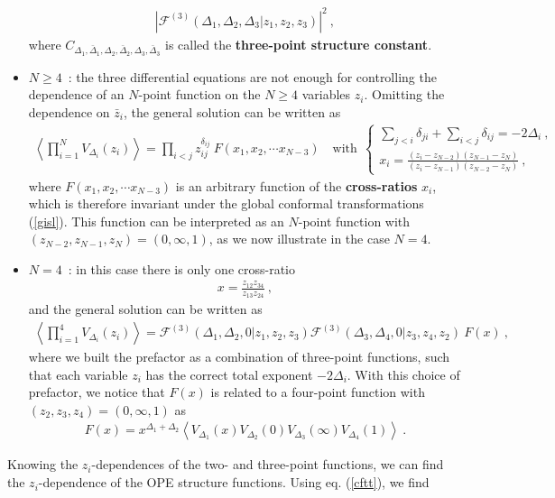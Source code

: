 \documentclass[12pt,a4paper,notitlepage]{report}
\newcommand \la {\left\langle}
\newcommand \ra {\right\rangle}
\newcommand \bla {\left\{\begin{array}{l} }
\newcommand \ela {\end{array}\right. }
\numberwithin{equation}{section}
\theoremstyle{break}
\begin{document}
\begin{itemize}
\begin{align}
 \left|\mathcal{F}^{(3)}(\Delta_1,\Delta_2,\Delta_3|z_1,z_2,z_3)\right|^2\ ,
\label{cff}
\end{align}
where $C_{\Delta_1,\bar{\Delta}_1,\Delta_2,\bar{\Delta}_2,\Delta_3,\bar{\Delta}_3}$ is called the \textbf{\boldmath three-point structure constant}.
\item $\boxed{N\geq 4}$\ : the three differential equations are not enough for controlling the dependence of an $N$-point function on the $N\geq 4$ variables $z_i$. Omitting the dependence on $\bar{z}_i$, the general solution can be written as 
\begin{align}
 \la\prod_{i=1}^N V_{\Delta_i}(z_i)\ra = \prod_{i<j} z_{ij}^{\delta_{ij}}\ F(x_1,x_2,\cdots x_{N-3}) \quad \text{with} \ \ \bla \sum_{j< i} \delta_{ji} +\sum_{i<j}\delta_{ij} = -2\Delta_i\ ,
\\ x_i = \frac{(z_i-z_{N-2})(z_{N-1}-z_N)}{(z_i-z_{N-1})(z_{N-2}-z_N)}\ , \ela
\label{xfxn}
\end{align}
where $F(x_1,x_2,\cdots x_{N-3})$ is an arbitrary function of the \textbf{\boldmath cross-ratios} $x_i$, which is therefore invariant under the global conformal transformations (\ref{gisl}).
This function can be interpreted as an $N$-point function with $(z_{N-2},z_{N-1},z_N)=(0,\infty,1)$, as we now illustrate in the case $N=4$.
\item $\boxed{N=4}$\ : in this case there is only one cross-ratio 
\begin{align}
 x=\frac{z_{12}z_{34}}{z_{13}z_{24}}\ ,
\label{xe}
\end{align}
and the general solution can be written as 
\begin{align}
 \la\prod_{i=1}^4 V_{\Delta_i}(z_i)\ra = \mathcal{F}^{(3)}(\Delta_1,\Delta_2,0|z_1,z_2,z_3) \mathcal{F}^{(3)}(\Delta_3,\Delta_4,0|z_3,z_4,z_2)\ F(x)\ ,
\label{zgg}
\end{align}
where we built the prefactor as a combination of three-point functions, such that each variable $z_i$ has the correct total exponent $-2\Delta_i$. With this choice of prefactor, we notice that $F(x)$ is related to a four-point function with $(z_2,z_3,z_4)=(0,\infty,1)$ as
\begin{align}
 F(x) =x^{\Delta_1+\Delta_2} \la V_{\Delta_1}(x)V_{\Delta_2}(0)V_{\Delta_3}(\infty) V_{\Delta_4}(1)\ra \ .
\label{fx}
\end{align}
\end{itemize}
Knowing the $z_i$-dependences of the two- and three-point functions, we can find the $z_i$-dependence of the OPE structure functions. Using eq. (\ref{cftt}), we find 
\end{document}
